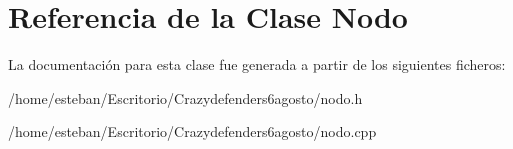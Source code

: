 \hypertarget{class_nodo}{\section{Referencia de la Clase Nodo}
\label{class_nodo}
}


La documentación para esta clase fue generada a partir de los siguientes ficheros\+:\begin{DoxyCompactItemize}
\item 
/home/esteban/\+Escritorio/\+Crazydefenders6agosto/nodo.\+h\item 
/home/esteban/\+Escritorio/\+Crazydefenders6agosto/nodo.\+cpp\end{DoxyCompactItemize}
